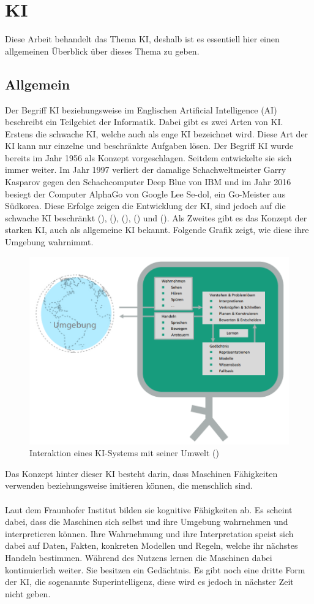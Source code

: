 \documentclass[12pt,toc=bib,toc=listof]{scrreprt}
\begin{document}
\section{KI} %
\label{sec:KI}
Diese Arbeit behandelt das Thema KI, deshalb ist es essentiell hier einen allgemeinen Überblick über dieses Thema zu geben.

\subsection{Allgemein} %
\label{sec:allgemein}
Der Begriff KI beziehungsweise im Englischen Artificial Intelligence (AI) beschreibt ein Teilgebiet der Informatik. Dabei gibt es zwei Arten von KI. Erstens die schwache KI, welche auch als enge KI bezeichnet wird. Diese Art der KI kann nur einzelne und beschränkte Aufgaben lösen. Der Begriff KI wurde bereits im Jahr 1956 als Konzept vorgeschlagen. Seitdem entwickelte sie sich immer weiter. Im Jahr 1997 verliert der damalige Schachweltmeister Garry Kasparov gegen den Schachcomputer Deep Blue von IBM und im Jahr 2016 besiegt der Computer AlphaGo von Google Lee Se-dol, ein Go-Meister aus Südkorea. Diese Erfolge zeigen die Entwicklung der KI, sind jedoch auf die schwache KI beschränkt (\cite{Bhatt2021}), (\cite{Hecker2018}), (\cite{Mocko2021}), (\cite{Roscher2025}) und (\cite{Zhu2021}). Als Zweites gibt es das Konzept der starken KI, auch als allgemeine KI bekannt. Folgende Grafik zeigt, wie diese ihre Umgebung wahrnimmt.
\begin{figure} [H]
    \centering
    \includegraphics[width=0.75\linewidth]{./Bilder/Fraunhofer_KI-Umgebung.png}
    \caption{Interaktion eines KI-Systems mit seiner Umwelt (\cite{Hecker2018})}
    \label{fig:enter-label}
\end{figure}
\noindent Das Konzept hinter dieser KI besteht darin, dass Maschinen Fähigkeiten verwenden beziehungsweise imitieren können, die menschlich sind.\\
\\
Laut dem Fraunhofer Institut bilden sie kognitive Fähigkeiten ab.
Es scheint dabei, dass die Maschinen sich selbst und ihre Umgebung wahrnehmen und interpretieren können. Ihre Wahrnehmung und ihre Interpretation speist sich dabei auf Daten, Fakten, konkreten Modellen und Regeln, welche ihr nächstes Handeln bestimmen. Während des Nutzens lernen die Maschinen dabei kontinuierlich weiter. Sie besitzen ein Gedächtnis. Es gibt noch eine dritte Form der KI, die sogenannte Superintelligenz, diese wird es jedoch in nächster Zeit nicht geben.
\end{document}
